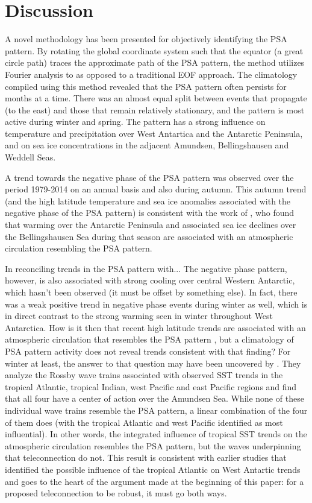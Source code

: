 \section{Discussion}

A novel methodology has been presented for objectively identifying the PSA pattern. By rotating the global coordinate system such that the equator (a great circle path) traces the approximate path of the PSA pattern, the method utilizes Fourier analysis to as opposed to a traditional EOF approach. The climatology compiled using this method revealed that the PSA pattern often persists for months at a time. There was an almost equal split between events that propagate (to the east) and those that remain relatively stationary, and the pattern is most active during winter and spring. The pattern has a strong influence on temperature and precipitation over West Antartica and the Antarctic Peninsula, and on sea ice concentrations in the adjacent Amundsen, Bellingshausen and Weddell Seas. 

A trend towards the negative phase of the PSA pattern was observed over the period 1979-2014 on an annual basis and also during autumn. This autumn trend (and the high latitude temperature and sea ice anomalies associated with the negative phase of the PSA pattern) is consistent with the work of \citet{Ding2013}, who found that warming over the Antarctic Peninsula and associated sea ice declines over the Bellingshausen Sea during that season are associated with an atmospheric circulation resembling the PSA pattern. 

In reconciling trends in the PSA pattern with... The negative phase  pattern, however, is also associated with strong cooling over central Western Antarctic, which hasn't been observed (it must be offset by something else). In fact, there was a weak positive trend in negative phase events during winter as well, which is in direct contrast to the strong warming seen in winter throughout West Antarctica. How is it then that recent high latitude trends are associated with an atmospheric circulation that resembles the PSA pattern \citep{Ding2011}, but a climatology of PSA pattern activity does not reveal trends consistent with that finding? For winter at least, the answer to that question may have been uncovered by \citet{Li2015a}. They analyze the Rossby wave trains associated with observed SST trends in the tropical Atlantic, tropical Indian, west Pacific and east Pacific regions and find that all four have a center of action over the Amundsen Sea. While none of these individual wave trains resemble the PSA pattern, a linear combination of the four of them does (with the tropical Atlantic and west Pacific identified as most influential). In other words, the integrated influence of tropical SST trends on the atmospheric circulation resembles the PSA pattern, but the waves underpinning that teleconnection do not. This result is consistent with earlier studies that identified the possible influence of the tropical Atlantic on West Antartic trends \citep{Li2014,Simpkins2014} and goes to the heart of the argument made at the beginning of this paper: for a proposed teleconnection to be robust, it must go both ways. 

